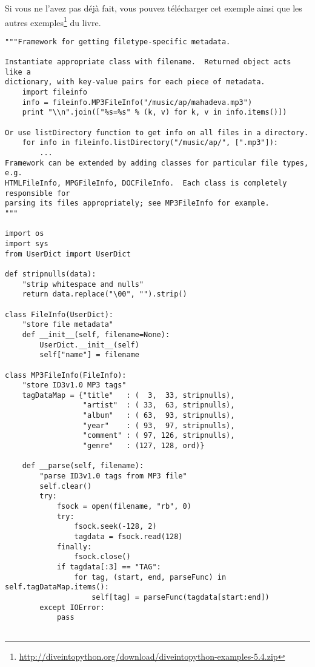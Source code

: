 \begin{example}[fileinfo.py]
Si vous ne l’avez pas déjà fait, vous pouvez télécharger cet exemple ainsi que les autres exemples\footnote{\url{http://diveintopython.org/download/diveintopython-examples-5.4.zip}} du livre.

\begin{lstlisting}
"""Framework for getting filetype-specific metadata.

Instantiate appropriate class with filename.  Returned object acts like a
dictionary, with key-value pairs for each piece of metadata.
    import fileinfo
    info = fileinfo.MP3FileInfo("/music/ap/mahadeva.mp3")
    print "\\n".join(["%s=%s" % (k, v) for k, v in info.items()])

Or use listDirectory function to get info on all files in a directory.
    for info in fileinfo.listDirectory("/music/ap/", [".mp3"]):
        ...
Framework can be extended by adding classes for particular file types, e.g.
HTMLFileInfo, MPGFileInfo, DOCFileInfo.  Each class is completely responsible for
parsing its files appropriately; see MP3FileInfo for example.
"""

import os
import sys
from UserDict import UserDict

def stripnulls(data):
    "strip whitespace and nulls"
    return data.replace("\00", "").strip()

class FileInfo(UserDict):
    "store file metadata"
    def __init__(self, filename=None):
        UserDict.__init__(self)
        self["name"] = filename

class MP3FileInfo(FileInfo):
    "store ID3v1.0 MP3 tags"
    tagDataMap = {"title"   : (  3,  33, stripnulls),
                  "artist"  : ( 33,  63, stripnulls),
                  "album"   : ( 63,  93, stripnulls),
                  "year"    : ( 93,  97, stripnulls),
                  "comment" : ( 97, 126, stripnulls),
                  "genre"   : (127, 128, ord)}

    def __parse(self, filename):
        "parse ID3v1.0 tags from MP3 file"
        self.clear()
        try:
            fsock = open(filename, "rb", 0)
            try:
                fsock.seek(-128, 2)
                tagdata = fsock.read(128)
            finally:
                fsock.close()
            if tagdata[:3] == "TAG":
                for tag, (start, end, parseFunc) in self.tagDataMap.items():
                    self[tag] = parseFunc(tagdata[start:end])
        except IOError:
            pass


\end{lstlisting}
\end{example}

